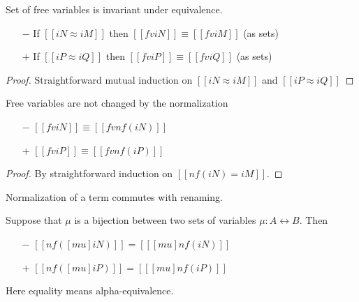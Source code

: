 \begin{lemma}
  \label{lemma:equiv-fv}
  Set of free variables is invariant under equivalence.
  \begin{itemize}
  \item[$-$] If $[[iN ≈ iM]]$ then $[[fv iN]] \equiv [[fv iM]]$ (as sets)
  \item[$+$] If $[[iP ≈ iQ]]$ then $[[fv iP]] \equiv [[fv iQ]]$ (as sets)
  \end{itemize}
\end{lemma}
\begin{proof}
  Straightforward mutual induction on $[[iN ≈ iM]]$ and $[[iP ≈ iQ]]$
\end{proof}


\begin{lemma}
  \label{lemma:fv-nf}
  Free variables are not changed by the normalization
  \begin{itemize}
  \item[$-$] $[[fv iN]] \equiv [[fv nf(iN)]]$
  \item[$+$] $[[fv iP]] \equiv [[fv nf(iP)]]$
  \end{itemize}
\end{lemma}
\begin{proof}
  By straightforward induction on $[[nf(iN) = iM]]$.
\end{proof}


\begin{lemma}
  \label{lemma:norm-subst-commute} Normalization of a term commutes with renaming.

  Suppose that $\mu$ is a bijection between two sets of variables
  $\mu : A \leftrightarrow B$. Then
  \begin{itemize}
    \item[$-$] $[[nf([mu]iN)]] = [[ [mu] nf(iN) ]]$
    \item[$+$] $[[nf([mu]iP)]] = [[ [mu] nf(iP) ]]$
  \end{itemize}
  Here equality means alpha-equivalence.
\end{lemma}

